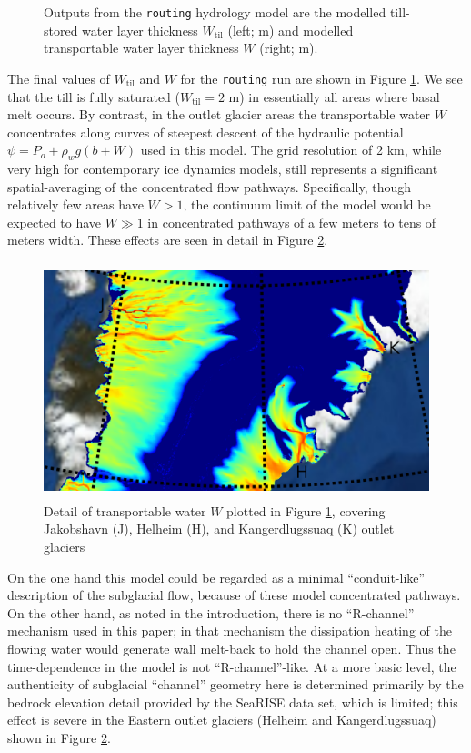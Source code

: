 \documentclass[gmd]{copernicus}   %
\newcommand{\text}{\textrm}
\newcommand{\Wtil}{W_{\text{til}}}
\begin{document}
\begin{figure}[ht]
\caption{Outputs from the \texttt{routing} hydrology model are the modelled till-stored water layer thickness $\Wtil$ (left; $\mathrm{m}$) and modelled transportable water layer thickness $W$ (right; $\mathrm{m}$).}
\label{fig:Greenroutingresults}
\end{figure}

The final values of $\Wtil$ and $W$ for the \texttt{routing} run are shown in Figure \ref{fig:Greenroutingresults}.  We see that the till is fully saturated ($\Wtil=2$ m) in essentially all areas where basal melt occurs.  By contrast, in the outlet glacier areas the transportable water $W$ concentrates along curves of steepest descent of the hydraulic potential $\psi=P_o + \rho_w g (b+W)$ used in this model.  The grid resolution of 2 km, while very high for contemporary ice dynamics models, still represents a significant spatial-averaging of the concentrated flow pathways.  Specifically, though relatively few areas have $W>1$, the continuum limit of the model would be expected to have $W\gg 1$ in concentrated pathways of a few meters to tens of meters width.  These effects are seen in detail in Figure \ref{fig:Greenroutingdetail}.

\begin{figure}[ht]
\includegraphics[height=2.7in,keepaspectratio=true]{detail-routing-decoupled-bwat}
\caption{Detail of transportable water $W$ plotted in Figure \ref{fig:Greenroutingresults}, covering Jakobshavn (J), Helheim (H), and Kangerdlugssuaq (K) outlet glaciers}
\label{fig:Greenroutingdetail}
\end{figure}

On the one hand this model could be regarded as a minimal ``conduit-like'' description of the subglacial flow, because of these model concentrated pathways.  On the other hand, as noted in the introduction, there is no ``R-channel'' mechanism used in this paper; in that mechanism the dissipation heating of the flowing water would generate wall melt-back to hold the channel open.  Thus the time-dependence in the model is not ``R-channel''-like.  At a more basic level, the authenticity of subglacial ``channel'' geometry here is determined primarily by the bedrock elevation detail provided by the SeaRISE data set, which is limited; this effect is severe in the Eastern outlet glaciers (Helheim and Kangerdlugssuaq) shown in Figure \ref{fig:Greenroutingdetail}.
\end{document}
